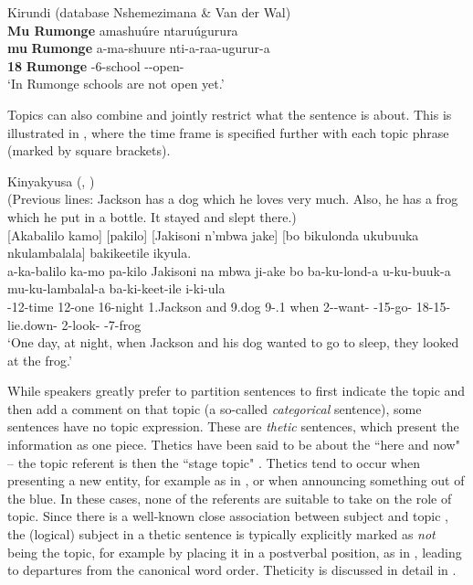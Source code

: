\documentclass[output=paper]{langscibook}
\begin{document}
\ex
\label{bkm:Ref145317717}
Kirundi (database Nshemezimana \& Van der Wal)\\
\textbf{Mu Rumonge} amashuúre ntaruúgurura\\
\gll
\textbf{mu}  \textbf{Rumonge}  a-ma-shuure  nti-a-raa-ugurur-a\\
\textbf{18}  \textbf{Rumonge}  \AUG{}-6-school  \SM-\INCP{}-open-\FV{}\\
\glt
‘In Rumonge schools are not open yet.’\\


\z

Topics can also combine and jointly restrict what the sentence is about. This is illustrated in , where the time frame is specified further with each topic phrase (marked by square brackets).\largerpage

\ea
\label{bkm:Ref145318359}
Kinyakyusa (, \cite{chapters/kinyakyusa})\\
(Previous lines: Jackson has a dog which he loves very much. Also, he has a frog which he put in a bottle. It stayed and slept there.)\\
{[Akabalilo kamo] [pakilo] [Jakisoni n’mbwa jake] [bo bikulonda ukubuuka nkulambalala] bakikeetile ikyula.}\\
\gll
a-ka-balilo  ka-mo  pa-kilo  Jakisoni  na  mbwa  ji-ake  bo   ba-ku-lond-a  u-ku-buuk-a  mu-ku-lambalal-a  ba-ki-keet-ile  i-ki-ula \\
\AUG{}-12-time  12-one  16-night  1.Jackson  and  9.dog  9-\POSS.1{}  when 2\SM-\PRS{}-want-\FV{}  \AUG{}-15-go-\FV{}  18-15-lie.down-\FV{}  2\OM{}-look-\PFV{}  \AUG{}-7-frog \\
\glt
‘One day, at night, when Jackson and his dog wanted to go to sleep, they looked at the frog.’\\

\z

While speakers greatly prefer to partition sentences to first indicate the topic and then add a comment on that topic (a so-called \textit{categorical} sentence), some sentences have no topic expression. These are \textit{thetic} sentences, which present the information as one piece. Thetics have been said to be about the ``here and now" – the topic referent is then the ``stage topic" \citep{Erteschik-Shir1997,Erteschik-Shir2007,Gundel1974}. Thetics tend to occur when presenting a new entity, for example as in , or when announcing something out of the blue. In these cases, none of the referents are suitable to take on the role of topic. Since there is a well-known close association between subject and topic \citep{LiThompson1976}, the (logical) subject in a thetic sentence is typically explicitly marked as \textit{not} being the topic, for example by placing it in a postverbal position, as in , leading to departures from the canonical word order. Theticity is discussed in detail in \citet{Sasse1987,Sasse1996,Sasse2006}.
\end{document}
